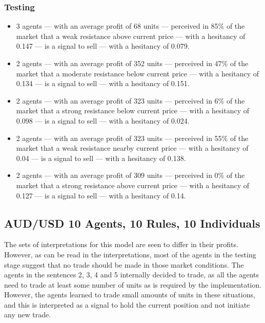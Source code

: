 \subsubsection{Testing}
\label{}

{\small
  \begin{itemize}
  \item 3 agents — with an average profit of 68 units — perceived in 85\% of the
    market that a weak resistance above current price — with a hesitancy of
    0.147 — is a signal to sell — with a hesitancy of 0.079.
  \item 2 agents — with an average profit of 352 units — perceived in 47\% of
    the market that a moderate resistance below current price — with a hesitancy
    of 0.134 — is a signal to sell — with a hesitancy of 0.151.
  \item 2 agents — with an average profit of 323 units — perceived in 6\% of the
    market that a strong resistance below current price — with a hesitancy of
    0.098 — is a signal to sell — with a hesitancy of 0.024.
  \item 2 agents — with an average profit of 323 units — perceived in 55\% of
    the market that a weak resistance nearby current price — with a hesitancy of
    0.04 — is a signal to sell — with a hesitancy of 0.138.
  \item 2 agents — with an average profit of 309 units — perceived in 0\% of the
    market that a strong resistance above current price — with a hesitancy of
    0.127 — is a signal to sell — with a hesitancy of 0.14.
  \end{itemize}
}

\subsection{AUD/USD 10 Agents, 10 Rules, 10 Individuals}
\label{results:interpretation-aud-usd-10agents-10rules-10individuals}

The sets of interpretations for this model are seen to differ in their
profits. However, as can be read in the interpretations, most of the agents in
the testing stage suggest that no trade should be made in those market
conditions. The agents in the sentences 2, 3, 4 and 5 internally decided to
trade, as all the agents need to trade at least some number of units as is
required by the implementation. However, the agents learned to trade small
amounts of units in these situations, and this is interpreted as a signal to
hold the current position and not initiate any new trade.


